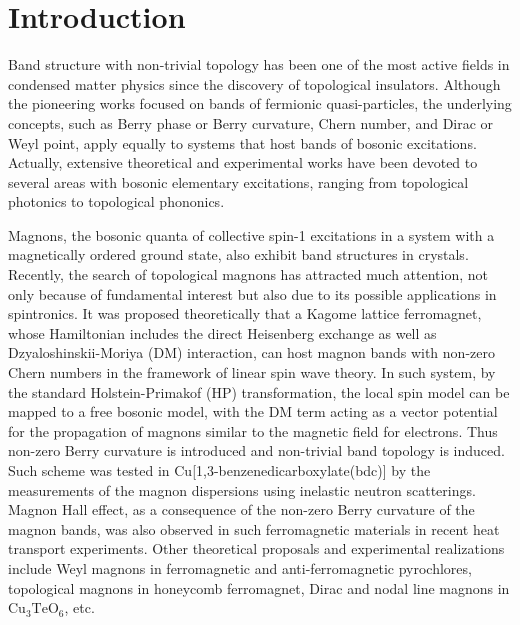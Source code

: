 \documentclass[amsmath,superscriptaddress,showpacs,aps,prb,twocolumn]{revtex4-1}
\begin{document}
\section{Introduction}
\par Band structure with non-trivial topology\cite{BLD_RMP2016} has been one of the most active fields in condensed matter physics since the discovery of topological insulators\cite{HK_RMP2010,QZ_RMP2011}. Although the pioneering works focused on bands of fermionic quasi-particles\cite{H_PRL1988,K_PU2001,KM_PRL2005,BHZ_S2006,QHRZ_PRL2009,YXL_PRL2011}, the underlying concepts, such as Berry phase or Berry curvature\cite{B_PRSA1984}, Chern number\cite{TKNN_PRL1982,S_PRL1983}, and Dirac or Weyl point\cite{WAVS_PRB2011}, apply equally to systems that host bands of bosonic excitations. Actually, extensive theoretical and experimental works have been devoted to several areas with bosonic elementary excitations, ranging from topological photonics\cite{LJS_NP2014} to topological phononics\cite{PP_PRL2009}.

\par Magnons, the bosonic quanta of collective spin-1 excitations in a system with a magnetically ordered ground state, also exhibit band structures in crystals. Recently, the search of topological magnons has attracted much attention\cite{OIKSNT_S2010,ZRWL_PRB2013,CHFSBNL_PRL2015,LLKBYC_NC2016,MHJM_PRL_2016,O_JPCM2016,RNF_NJP2016,MS_PRB2017,SWW_PRB2017,LF_PRL2017,M_NP2017,MHM_PRB2017,LLHLF_PRL2017,YLWXDIKLFL_arXiv2017,BWWCLMWRDAWYJW_arXiv2017}, not only because of fundamental interest but also due to its possible applications in spintronics\cite{CVSH_NP2015}. It was proposed theoretically\cite{OIKSNT_S2010,ZRWL_PRB2013} that a Kagome lattice ferromagnet, whose Hamiltonian includes the direct Heisenberg exchange as well as Dzyaloshinskii-Moriya (DM) interaction\cite{D_JPCS1958,M_PR1960}, can host magnon bands with non-zero Chern numbers in the framework of linear spin wave theory. In such system, by the standard Holstein-Primakof (HP) transformation\cite{HP_PR1940}, the local spin model can be mapped to a free bosonic model, with the DM term acting as a vector potential for the propagation of magnons similar to the magnetic field for electrons. Thus non-zero Berry curvature is introduced and non-trivial band topology is induced. Such scheme was tested in Cu[1,3-benzenedicarboxylate(bdc)] by the measurements of the magnon dispersions using inelastic neutron scatterings\cite{CHFSBNL_PRL2015}. Magnon Hall effect\cite{KNL_PRL2010}, as a consequence of the non-zero Berry curvature of the magnon bands, was also observed in such ferromagnetic materials in recent heat transport experiments\cite{OIKSNT_S2010,HCLO_PRL2015}. Other theoretical proposals and experimental realizations include Weyl magnons in ferromagnetic and anti-ferromagnetic pyrochlores\cite{LLKBYC_NC2016,MHJM_PRL_2016,SWW_PRB2017}, topological magnons in honeycomb ferromagnet\cite{O_JPCM2016}, Dirac and nodal line magnons in $\text{Cu}_3\text{TeO}_6$\cite{LLHLF_PRL2017,YLWXDIKLFL_arXiv2017,BWWCLMWRDAWYJW_arXiv2017}, etc.
\end{document}
